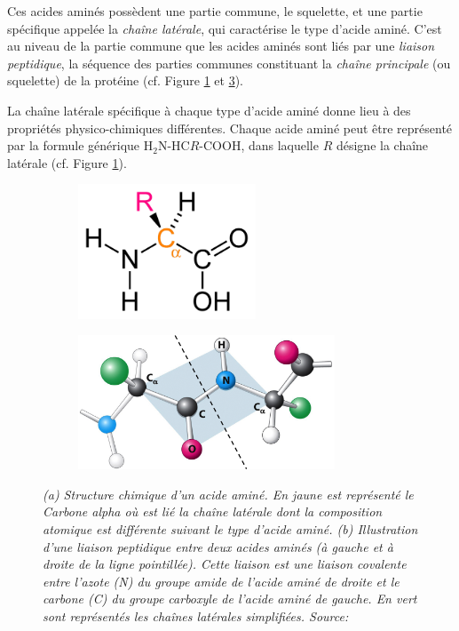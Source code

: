 Ces acides aminés possèdent une partie commune, le squelette, et une partie spécifique appelée la \textit{chaîne latérale}, qui caractérise le type d'acide aminé. C'est au niveau de la partie commune que les acides aminés sont liés par une \textit{liaison peptidique}, la séquence des parties communes constituant la \textit{chaîne principale} (ou squelette) de la protéine (cf. Figure \ref{Fig:amino_acid_structure} et \ref{Fig:peptide_bond}). 

La chaîne latérale spécifique à chaque type d'acide aminé donne lieu à des propriétés physico-chimiques différentes. Chaque acide aminé peut être représenté par la formule générique H$_{2}$N-HC$R$-COOH, dans laquelle $R$ désigne la chaîne latérale (cf. Figure \ref{Fig:amino_acid_structure}).

\begin{figure}[htb]
  \begin{subfigure}{.4\textwidth}
  \centering
  {\includegraphics[height=4cm]{./figures/ch1/amino_acid_structure}}
    \caption{}
    \label{Fig:amino_acid_structure}
  \end{subfigure}
  \begin{subfigure}{.6\textwidth}
  \centering
  {\includegraphics[height=4cm]{./figures/ch1/peptidic_bond.png}}
    \caption{}
    \label{Fig:peptide_bond}
  \end{subfigure}
  \caption[(a) Structure chimique d'un acide aminé. (b) Illustration d'une liaison peptidique entre deux acides aminés.]{\it (a) Structure chimique d'un acide aminé. En jaune est représenté le Carbone alpha où est lié la chaîne latérale dont la composition atomique est différente suivant le type d'acide aminé.
  (b) Illustration d'une liaison peptidique entre deux acides aminés (à gauche et à droite de la ligne pointillée). Cette liaison est une liaison covalente entre l'azote (N) du groupe amide de l'acide aminé de droite et le carbone (C) du groupe carboxyle de l'acide aminé de gauche. En vert sont représentés les chaînes latérales simplifiées. Source: \cite{berg_biochemistry_2012}}
\end{figure}
